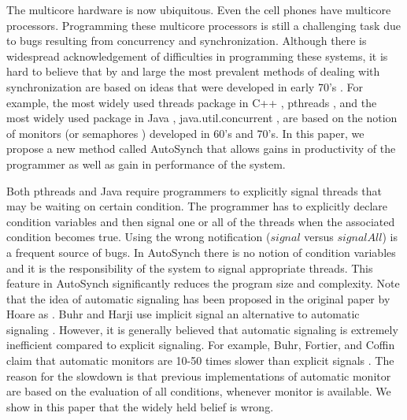\documentclass[preprint]{sigplanconf}
\begin{document}
The multicore hardware is now ubiquitous. Even the cell phones have
multicore processors. Programming these multicore processors is
still a challenging task due to
bugs resulting from concurrency and synchronization.
Although there is widespread acknowledgement of difficulties 
in programming these systems, it is hard to believe that by and large the most 
prevalent methods of dealing with synchronization are based on ideas that were 
developed in early 70's \cite{dijk68, hoa74, bh75a}. For 
example, the most widely used threads package in C++ \cite{stro97}, 
pthreads \cite{bute97}, and the most widely used package in Java \cite{gjs00}, 
java.util.concurrent \cite{lea05}, are based
on the notion of monitors \cite{hoa74, bh75a}(or semaphores \cite{dijk68}) 
developed in 60's and 70's.
In this paper, we propose a new method called AutoSynch 
that allows gains in productivity of the programmer as well as gain in
performance of the system.

Both pthreads and Java require programmers to explicitly
signal threads that may be waiting on certain condition. The programmer
has to explicitly declare condition variables and then signal one
or all of the threads when the associated condition becomes true.
Using the wrong notification ($signal$ versus $signalAll$) is a frequent
source of bugs. In AutoSynch there is no notion of condition variables
and it is the responsibility of the system to signal appropriate threads.
This feature in AutoSynch significantly reduces the program size and complexity.
Note that the idea of automatic signaling has been proposed 
in the original paper by Hoare as \cite{hoa74}. Buhr and Harji use implicit
signal an alternative to automatic signaling \cite{bh05}. 
However, it is generally believed that automatic 
signaling is extremely inefficient compared to explicit signaling. 
For example, Buhr, Fortier, and Coffin claim that automatic monitors are 10-50 times
slower than explicit signals \cite{bfc95}. The reason for the slowdown is that
previous implementations of automatic monitor are based on the
evaluation of all conditions, whenever monitor is available. We show in this
paper that the widely held belief is wrong. 
\end{document}
